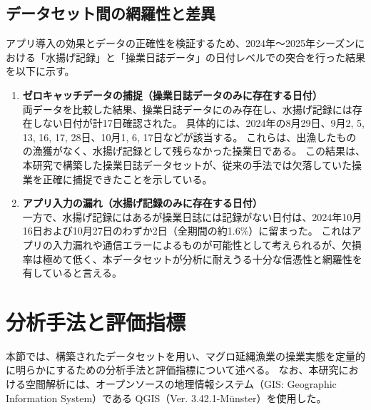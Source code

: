 \subsection{データセット間の網羅性と差異}
アプリ導入の効果とデータの正確性を検証するため、2024年〜2025年シーズンにおける「水揚げ記録」と「操業日誌データ」の日付レベルでの突合を行った結果を以下に示す。

\begin{enumerate}
  \item \textbf{ゼロキャッチデータの捕捉（操業日誌データのみに存在する日付）} \\
  両データを比較した結果、操業日誌データにのみ存在し、水揚げ記録には存在しない日付が計17日確認された。
  具体的には、2024年の8月29日、9月2, 5, 13, 16, 17, 28日、10月1, 6, 17日などが該当する。
  これらは、出漁したものの漁獲がなく、水揚げ記録として残らなかった操業日である。
  この結果は、本研究で構築した操業日誌データセットが、従来の手法では欠落していた操業を正確に捕捉できたことを示している。

  \item \textbf{アプリ入力の漏れ（水揚げ記録のみに存在する日付）} \\
  一方で、水揚げ記録にはあるが操業日誌には記録がない日付は、2024年10月16日および10月27日のわずか2日（全期間の約1.6\%）に留まった。
  これはアプリの入力漏れや通信エラーによるものが可能性として考えられるが、欠損率は極めて低く、本データセットが分析に耐えうる十分な信憑性と網羅性を有していると言える。
\end{enumerate}


\section{分析手法と評価指標}
\label{sec:visualization}
本節では、構築されたデータセットを用い、マグロ延縄漁業の操業実態を定量的に明らかにするための分析手法と評価指標について述べる。
なお、本研究における空間解析には、オープンソースの地理情報システム（GIS: Geographic Information System）である QGIS（Ver. 3.42.1-Münster）を使用した。

